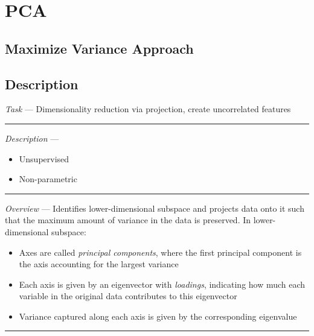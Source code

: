 \section{PCA}
\subsection*{Maximize Variance Approach}
\subsection*{Description}
\emph{Task} --- Dimensionality reduction via projection, create uncorrelated features

{\color{lightgray}\hrule height 0.001mm}

\emph{Description} --- 
\begin{itemize}
    \item Unsupervised
    \item Non-parametric
\end{itemize}

{\color{lightgray}\hrule height 0.001mm}

\emph{Overview} --- 
Identifies lower-dimensional subspace and projects data onto it such that the maximum amount of variance in the data is preserved. In lower-dimensional subspace:
\begin{itemize}
    \item Axes are called \emph{principal components}, where the first principal component is the axis accounting for the largest variance
    \item Each axis is given by an eigenvector with \emph{loadings}, indicating how much each variable in the original data contributes to this eigenvector
    \item Variance captured along each axis is given by the corresponding eigenvalue
\end{itemize}

{\color{black}\hrule height 0.001mm}

